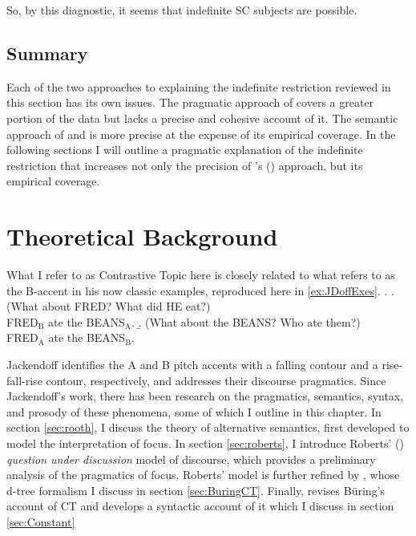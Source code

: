 \documentclass[letterpaper]{article}
\begin{document}
So, by this diagnostic, it seems that indefinite SC subjects are possible.
\subsection{Summary}
Each of the two approaches to explaining the indefinite restriction reviewed in this section has its own issues.
The pragmatic approach of \textcite{mikkelsen2005copular} covers a greater portion of the data but lacks a precise and cohesive account of it.
The semantic approach of \textcite{heycockkroch1999pseudocleft} and \textcite{heycock2012specification} is more precise at the expense of its empirical coverage.
In the following sections I will outline a pragmatic explanation of the indefinite restriction that increases not only the precision of \citeauthor{mikkelsen2005copular}'s (\citeyear{mikkelsen2005copular}) approach, but its empirical coverage.
\section{Theoretical Background}\label{sec:TheoryBackground}
What I refer to as Contrastive Topic here is closely related to what \textcite{jackendoff1972semantics} refers to as the B-accent in his now classic examples, reproduced here in \ref{ex:JDoffExes}.
\ex.\label{ex:JDoffExes}
\a. (What about FRED? What did HE eat?)\\
FRED$_{\text{B}}$ ate the BEANS$_{\text{A}}$.
\b. (What about the BEANS? Who ate them?)\\
FRED$_{\text{A}}$ ate the BEANS$_{\text{B}}$.\hfill\parencite[261]{jackendoff1972semantics}

Jackendoff identifies the A and B pitch accents with a falling contour and a rise-fall-rise contour, respectively, and addresses their discourse pragmatics.
Since Jackendoff's work, there has been research on the pragmatics, semantics, syntax, and prosody of these phenomena, some of which I outline in this chapter.
In section \ref{sec:rooth}, I discuss the theory of alternative semantics, first developed to model the interpretation of focus.
In section \ref{sec:roberts}, I introduce Roberts' (\citeyear{roberts2012information}) \textit{question under discussion} model of discourse, which provides a preliminary analysis of the pragmatics of focus.
Roberts' model is further refined by \textcite{buring2003d}, whose d-tree formalism I discuss in section \ref{sec:BuringCT}.
Finally, \textcite{constant2014diss} revises B\"uring's account of CT and develops a syntactic account of it which I discuss in section \ref{sec:Constant}
\end{document}
